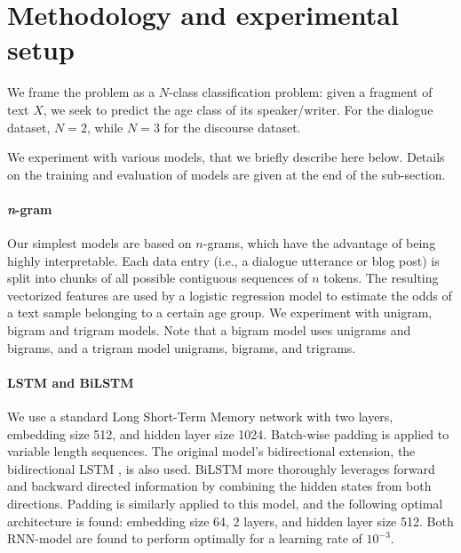 \section{Methodology and experimental setup}

We frame the problem as a $N$-class classification problem: given a fragment of text $X$, we seek to predict
the age class of its speaker/writer.
For the dialogue dataset, $N=2$, while $N=3$ for the discourse dataset.

We experiment with various models, that we briefly describe here below. Details on the training and evaluation of models are given at the end of the sub-section.

\paragraph{\textit{n}-gram} 
Our simplest models are based on $n$-grams, which have the advantage of being highly interpretable.
Each data entry (i.e., a dialogue utterance or blog post) is split into chunks of all possible contiguous sequences of $n$ tokens. The resulting vectorized features are used by a logistic regression model to estimate the odds of a text sample belonging to a certain age group. We experiment with unigram, bigram and trigram models. Note that a bigram model uses unigrams and bigrams, and a trigram model unigrams, bigrams, and trigrams.

\paragraph{LSTM and BiLSTM} We
use a standard Long Short-Term Memory network \cite[LSTM;][]{hochreiter1997long} with two layers, embedding size 512, and hidden layer size 1024. Batch-wise padding is applied to variable length sequences. The original model's bidirectional extension, the bidirectional LSTM \cite[BiLSTM;][]{schuster1997bidirectional}, is also used.
BiLSTM more thoroughly leverages forward and backward directed information by combining the hidden states from both directions. Padding is similarly applied to this model, and the following optimal architecture is found: embedding size 64, 2 layers, and hidden layer size 512. Both RNN-model are found to perform optimally for a learning rate of $10^{-3}$.

